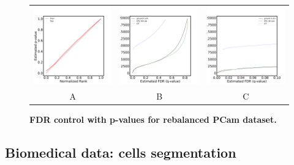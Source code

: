 \documentclass{article}
\begin{document}
\begin{figure}
	\advance\leftskip-0.5cm
	\begin{tabular}{ccc}
 		\includegraphics[width=2.5in]{img/pcam_balanced_QQ.pdf} &
		\includegraphics[width=2.5in]{img/pcam_balanced_fdr_control.pdf} & 
            \includegraphics[width=2.5in]{img/pcam_balanced_fdr_control_loc.pdf}
		\\	
		A & B & C
	\end{tabular}
	\caption{\bf FDR control with p-values for rebalanced PCam dataset.}
	\label{fig:pcam}
\end{figure} 

\subsection{Biomedical data: cells segmentation}
\end{document}
